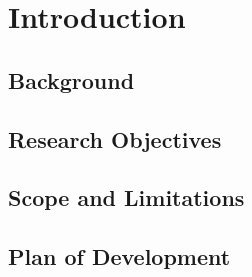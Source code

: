 \chapter{Introduction}
\section{Background}
\lipsum[1]
\section{Research Objectives}
\lipsum[1]
\section{Scope and Limitations}
\lipsum[1]
\section{Plan of Development}
\lipsum[1-9]